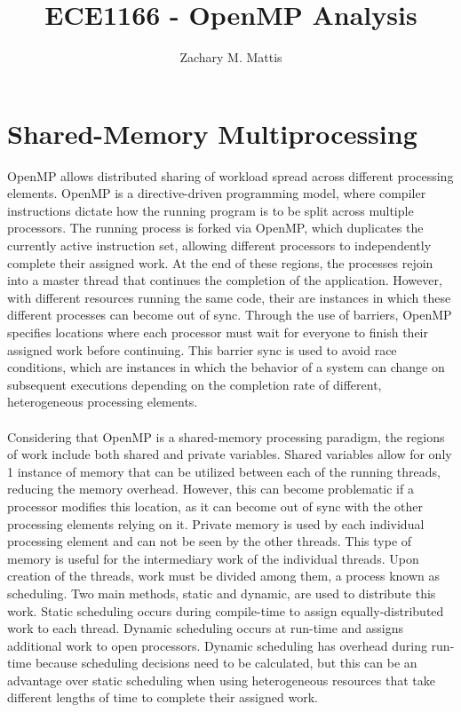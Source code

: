 \documentclass[12pt, letterpaper]{report}
\title{ECE1166 - OpenMP Analysis}
\author{Zachary M. Mattis}
\begin{document}
	
\maketitle


\section{Shared-Memory Multiprocessing}

OpenMP allows distributed sharing of workload spread across different processing elements. OpenMP is a directive-driven programming model, where compiler instructions dictate how the running program is to be split across multiple processors. The running process is forked via OpenMP, which duplicates the currently active instruction set, allowing different processors to independently complete their assigned work. At the end of these regions, the processes rejoin into a master thread that continues the completion of the application. However, with different resources running the same code, their are instances in which these different processes can become out of sync. Through the use of barriers, OpenMP specifies locations where each processor must wait for everyone to finish their assigned work before continuing. This barrier sync is used to avoid race conditions, which are instances in which the behavior of a system can change on subsequent executions depending on the completion rate of different, heterogeneous processing elements.
\\ \\
Considering that OpenMP is a shared-memory processing paradigm, the regions of work include both shared and private variables. Shared variables allow for only 1 instance of memory that can be utilized between each of the running threads, reducing the memory overhead. However, this can become problematic if a processor modifies this location, as it can become out of sync with the other processing elements relying on it. Private memory is used by each individual processing element and can not be seen by the other threads. This type of memory is useful for the intermediary work of the individual threads. Upon creation of the threads, work must be divided among them, a process known as scheduling. Two main methods, static and dynamic, are used to distribute this work. Static scheduling occurs during compile-time to assign equally-distributed work to each thread. Dynamic scheduling occurs at run-time and assigns additional work to open processors. Dynamic scheduling has overhead during run-time because scheduling decisions need to be calculated, but this can be an advantage over static scheduling when using heterogeneous resources that take different lengths of time to complete their assigned work.
\end{document}
